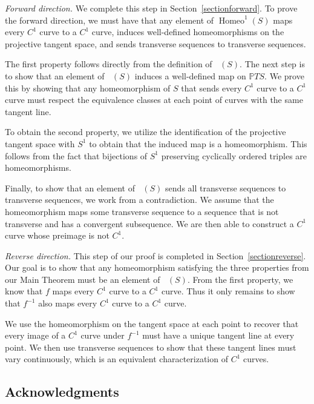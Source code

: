 \documentclass[sn-mathphys-num]{sn-jnl}%
\theoremstyle{thmstyleone}%
\theoremstyle{thmstyletwo}%
\theoremstyle{thmstylethree}%
\DeclareMathOperator{\homeo}{Homeo}
\DeclareMathOperator{\thomeo}{Homeo^{1}}
\begin{document}
\medskip

\noindent \textit{Forward direction.} We complete this step in Section~\ref{sectionforward}.  
To prove the forward direction, we must have that any element of $\homeo^1(S)$ maps every $C^1$ curve to a $C^1$ curve,  induces well-defined homeomorphisms on the projective tangent space,  and sends transverse sequences to transverse sequences.  

The first property follows directly from the definition of $\thomeo(S)$.  The next step is to show that an element of $\thomeo(S)$ induces a well-defined map on $\mathbb{P}TS$.   We prove this by showing that any homeomorphism of $S$ that sends every $C^1$ curve to a $C^1$ curve must respect the equivalence classes at each point of curves with the same tangent line.

To obtain the second property, we utilize the identification of the projective tangent space with $S^1$ to obtain that the induced map is a homeomorphism. This follows from the fact that bijections of $S^1$ preserving cyclically ordered triples are homeomorphisms.

Finally,  to show that an element of $\thomeo(S)$ sends all transverse sequences to transverse sequences, we work from a contradiction.  We assume that the homeomorphism maps some transverse sequence to a sequence that is not transverse and has a convergent subsequence.  We are then able to construct a $C^1$ curve whose preimage is not $C^1$.

\medskip

\noindent \textit{Reverse direction.}
This step of our proof is completed in Section~\ref{sectionreverse}.  Our goal is to show that any homeomorphism satisfying the three properties from our Main Theorem must be an element of $\thomeo(S)$.  From the first property, we know that $f$ maps every $C^1$ curve to a $C^1$ curve. Thus it only remains to show that $f^{-1}$ also maps every $C^1$ curve to a $C^1$ curve.  

We use the homeomorphism on the tangent space at each point to recover that every image of a $C^1$ curve under $f^{-1}$ must have a unique tangent line at every point.  We then use transverse sequences to show that these tangent lines must vary continuously, which is an equivalent characterization of $C^1$ curves. 


\subsection{Acknowledgments}
\end{document}

